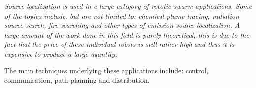 
  \emph{Source localization is used in a large category of robotic-swarm applications. Some of the topics include, but are not limited to: chemical plume tracing\cite{zarzhitsky2005distributed}, radiation source search\cite{bashyal2008human}, fire searching\cite{marjovi2009multi} and other types of emission source localization\cite{cui2004swarm}. A large amount of the work done in this field is purely theoretical, this is due to the fact that the price of these individual robots is still rather high and thus it is expensive to produce a large quantity.}

  The main techniques underlying these applications include: control, communication, path-planning and distribution.\cite{Li2012}
